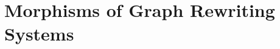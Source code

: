 %          
%         
%     
%      
\section{Morphisms of Graph Rewriting Systems}
    \label{sec:morphisms_from_dpo_to_pbpop}
